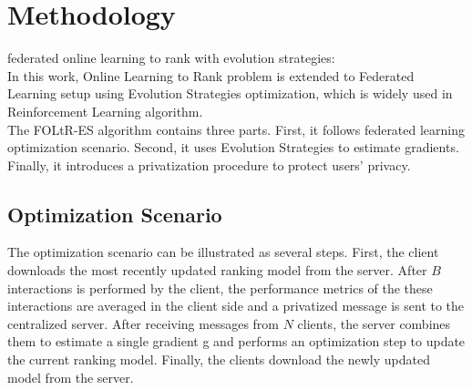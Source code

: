 
\section{Methodology}


federated online learning to rank with evolution strategies:\\
In this work, Online Learning to Rank problem is extended to Federated Learning setup using Evolution Strategies optimization, which is widely used in Reinforcement Learning algorithm.\\
The FOLtR-ES algorithm contains three parts. First, it follows federated learning optimization scenario. Second, it uses Evolution Strategies to estimate gradients. Finally, it introduces a privatization procedure to protect users' privacy.

\subsection{ Optimization Scenario}
The optimization scenario can be illustrated as several steps. First, the client downloads the most recently updated ranking model from the server. After $B$ interactions is performed by the client, the performance metrics of the these interactions are averaged in the client side and a privatized message is sent to the centralized server. After receiving messages from $N$ clients, the server combines them to estimate a single gradient g and performs an optimization step to update the current ranking model. Finally, the clients download the newly updated model from the server.

